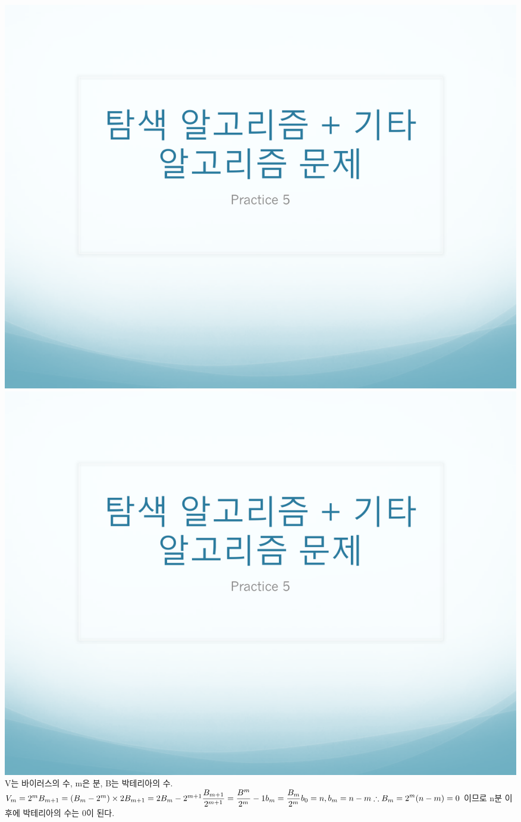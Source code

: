 \documentclass[12pt,a4paper]{article}
\begin{document}
\includegraphics[page=7, width=\textwidth]{1.pdf}
\includegraphics[page=8, width=\textwidth]{1.pdf}
V는 바이러스의 수, m은 분, B는 박테리아의 수.\\
$V_m=2^m\\
B_{m+1} = (B_m - 2^{m}) \times 2\\
B_{m+1} = 2B_m-2^{m+1}\\
\displaystyle\frac{B_{m+1}}{2^{m+1}}=\frac{B^m}{2^m}-1\\
b_m = \frac{B_m}{2^m}\\
b_0 = n, b_m = n - m\\
\therefore B_m = 2^m(n-m)=0
$
이므로 n분 이후에 박테리아의 수는 0이 된다.
\end{document}
